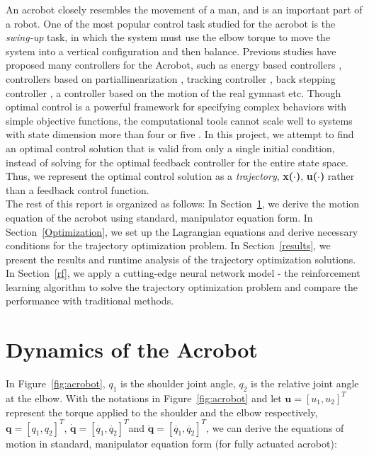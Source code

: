 \null \quad An acrobot closely resembles the movement of a man, and is an important part of a robot. One of the most popular control task studied for the acrobot is the \textit{swing-up} \cite{spong} task, in which the system must use the elbow torque to move the system into a vertical configuration and then balance. Previous studies have proposed many controllers for the Acrobot, such as energy based controllers \cite{1}\cite{2}, controllers based on partiallinearization \cite{1}\cite{3}, tracking controller \cite{4}, back stepping controller \cite{5}, a controller based on the motion of the real gymnast \cite{6} etc. Though optimal control is a powerful framework for specifying complex behaviors with simple objective functions, the computational tools cannot scale well to systems with state dimension more than four or five \cite{tedrake}. In this project, we attempt to find an optimal control solution that is valid from only a single initial condition, instead of solving for the optimal feedback controller for the entire state space. Thus, we represent the optimal control solution as a \textit{trajectory}, \textbf{x($\cdot$)}, \textbf{u($\cdot$)} rather than a feedback control function. \\
\null\quad The rest of this report is organized as follows: In Section~\ref{Dynamics of the Acrobot}, we derive the motion equation of the acrobot using standard, manipulator equation form. In Section~\ref{Optimization}, we set up the Lagrangian equations and derive necessary conditions for the trajectory optimization problem. In Section~\ref{results}, we present the results and runtime analysis of the trajectory optimization solutions. In Section~\ref{rf}, we apply a cutting-edge neural network model - the reinforcement learning algorithm to solve the trajectory optimization problem and compare the performance with traditional methods.

\section{Dynamics of the Acrobot} \label{Dynamics of the Acrobot}
\quad In Figure~\ref{fig:acrobot}, $q_1$ is the shoulder joint angle, $q_2$ is the relative joint angle at the elbow. With the notations in Figure~\ref{fig:acrobot} and let $\mathbf u=[u_1, u_2]^T$ represent the torque applied to the shoulder and the elbow respectively, $\mathbf q = [q_1, q_2]^T$, $\mathbf {\dot q} = [\dot{q_1}, \dot{q_2}]^T$and $\mathbf {\ddot q} = [\ddot{q_1}, \ddot{q_2}]^T$, we can derive the equations of motion in standard, manipulator equation form (for fully actuated acrobot):

